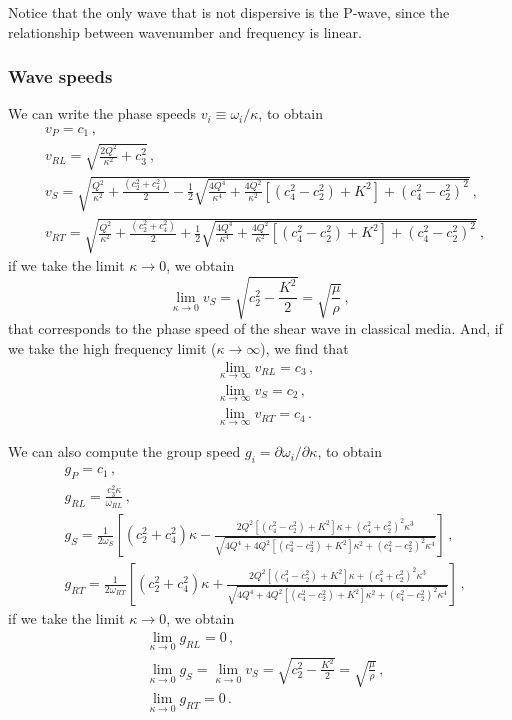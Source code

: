 \documentclass[12pt]{article}
\begin{document}
Notice that the only wave that is not dispersive is the P-wave, since the relationship between wavenumber and frequency is linear.

\subsubsection{Wave speeds}
We can write the phase speeds \(v_i \equiv \omega_i/\kappa\), to obtain
\begin{align}
&v_P = c_1 \, ,\\
&v_{RL} = \sqrt{\frac{2Q^2}{\kappa^2} + c_3^2}\, ,\\
&v_S = \sqrt{\frac{Q^2}{\kappa^2} + \frac{(c_2^2 + c_4^2)}{2} - \frac{1}{2} \sqrt{\frac{4Q^4}{\kappa^4} + \frac{4Q^2}{\kappa^2}[(c_4^2 - c_2^2) + K^2] + (c_4^2 - c_2^2)^2}}\, ,\\
&v_{RT} = \sqrt{\frac{Q^2}{\kappa^2} + \frac{(c_2^2 + c_4^2)}{2} + \frac{1}{2} \sqrt{\frac{4Q^4}{\kappa^4} + \frac{4Q^2}{\kappa^2}[(c_4^2 - c_2^2) + K^2] + (c_4^2 - c_2^2)^2}}\, ,
\end{align}
if we take the limit \(\kappa \rightarrow 0\), we obtain
\[\lim_{\kappa \rightarrow 0} v_S = \sqrt{c_2^2 - \frac{K^2}{2}}=\sqrt{\frac{\mu}{\rho}}\, ,\]
that corresponds to the phase speed of the shear wave in classical media. And, if we take the high frequency limit (\(\kappa \rightarrow \infty\)), we find that
\begin{align*}
&\lim_{\kappa \rightarrow \infty}v_{RL} = c_3\, ,\\
&\lim_{\kappa \rightarrow \infty}v_S = c_2\, ,\\
&\lim_{\kappa \rightarrow \infty}v_{RT} = c_4\, .
\end{align*}

We can also compute the group speed \(g_i = \partial \omega_i/\partial \kappa\), to obtain
\begin{align}
&g_P = c_1 \, ,\\
&g_{RL} = \frac{c_3^2 \kappa}{\omega_{RL}}\, ,\\
&g_S = \frac{1}{2\omega_S}\left[(c_2^2 + c_4^2)\kappa - \frac{2Q^2[(c_4^2 - c_2^2) + K^2]\kappa + (c_4^2 + c_2^2)^2\kappa^3}{\sqrt{4Q^4 + 4Q^2[(c_4^2 - c_2^2) + K^2]\kappa^2 + (c_4^2 - c_2^2)^2 \kappa^4}}\right] \, ,\\
&g_{RT} = \frac{1}{2\omega_{RT}}\left[(c_2^2 + c_4^2)\kappa + \frac{2Q^2[(c_4^2 - c_2^2) + K^2]\kappa + (c_4^2 + c_2^2)^2\kappa^3}{\sqrt{4Q^4 +  4Q^2[(c_4^2 - c_2^2) + K^2]\kappa^2 + (c_4^2 - c_2^2)^2 \kappa^4}}\right]\, ,
\end{align}
if we take the limit \(\kappa \rightarrow 0\), we obtain
\begin{align*}
&\lim_{\kappa \rightarrow 0}g_{RL} = 0\, ,\\
&\lim_{\kappa \rightarrow 0}g_S = \lim_{\kappa \rightarrow 0} v_S = \sqrt{c_2^2 - \frac{K^2}{2}}=\sqrt{\frac{\mu}{\rho}}\, ,\\
&\lim_{\kappa \rightarrow 0}g_{RT} = 0\, .
\end{align*}
\end{document}
